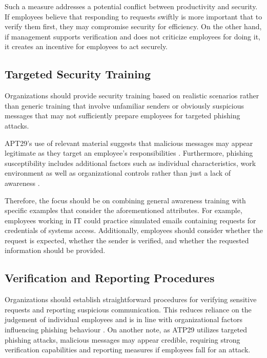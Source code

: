 Such a measure addresses a potential conflict between productivity and security. If employees believe that responding to requests swiftly is more important that to verify them first, they may compromise security for efficiency. On the other hand, if management supports verification and does not criticize employees for doing it, it creates an incentive for employees to act securely.  

\subsection{Targeted Security Training}

Organizations should provide security training based on realistic scenarios rather than generic training that involve unfamiliar senders or obviously suspicious messages that may not sufficiently prepare employees for targeted phishing attacks.  

APT29's use of relevant material suggests that malicious messages may appear legitimate as they target an employee's responsibilities \parencite{geers2015cyber, cisa-russia-advisories}. Furthermore, phishing susceptibility includes additional factors such as individual characteristics, work environment as well as organizational controls rather than just a lack of awareness \parencite{Spicer2026}. 

Therefore, the focus should be on combining general awareness training with specific examples that consider the aforementioned attributes. For example, employees working in IT could practice simulated emails containing requests for credentials of systems access. Additionally, employees should consider whether the request is expected, whether the sender is verified, and whether the requested information should be provided. 

\subsection{Verification and Reporting Procedures}

Organizations should establish straightforward procedures for verifying sensitive requests and reporting suspicious communication. This reduces reliance on the judgement of individual employees and is in line with organizational factors influencing phishing behaviour \parencite{Spicer2026}. On another note, as ATP29 utilizes targeted phishing attacks, malicious messages may appear credible, requiring strong verification capabilities and reporting measures if employees fall for an attack. 

